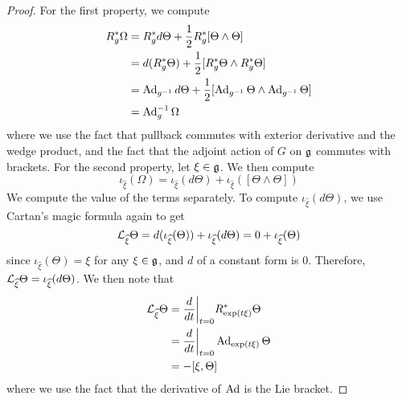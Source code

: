 \begin{proof}
For the first property, we compute
\begin{align*}
R_g^*\Omega &= R_g^*d\Theta + \frac{1}{2} R_g^*[\Theta \wedge \Theta] \\
&= d(R_g^*\Theta)+ \frac{1}{2}[R_g^*\Theta \wedge R_g^*\Theta]\\
&= \operatorname{Ad}_{g^{-1}}d\Theta + \frac{1}{2}[\operatorname{Ad}_{g^{-1}}\Theta \wedge \operatorname{Ad}_{g^{-1}}\Theta] \\
&= \operatorname{Ad}_g^{-1}\Omega
\end{align*}
where we use the fact that pullback commutes with exterior derivative and
the wedge product, and the fact that the adjoint action of $G$ on $\mathfrak{g}$ commutes with
brackets. For the second property, let $\xi \in \mathfrak{g}$. We then compute
\[
\iota_{\widehat{\xi}}(\Omega) = \iota_{\widehat{\xi}}(d\Theta)
+ \iota_{\widehat{\xi}}([\Theta \wedge \Theta])
\]
We compute the value of the terms separately. To compute $\iota_{\widehat{\xi}}(d\Theta)$,
we use Cartan's magic formula again to get
\[
\mathcal{L}_{\widehat{\xi}}\Theta = d(\iota_{\widehat{\xi}}(\Theta))
+ \iota_{\widehat{\xi}}(d\Theta) = 0 + \iota_{\widehat{\xi}}(\Theta)
\]
since $\iota_{\widehat{\xi}}(\Theta) = \xi$ for any $\xi \in \mathfrak{g}$, and $d$ of a
constant form is $0$. Therefore,
$\mathcal{L}_{\widehat{\xi}}\Theta = \iota_{\widehat{\xi}}(d\Theta)$. We then note that
\begin{align*}
\mathcal{L}_{\widehat{\xi}}\Theta &= \frac{d}{dt}\bigg\vert_{t = 0} R_{\exp(t\xi)}^*\Theta \\
&= \frac{d}{dt}\bigg\vert_{t=0} \operatorname{Ad}_{\exp(t\xi)}\Theta \\
&= -[\xi, \Theta]
\end{align*}
where we use the fact that the derivative of $\operatorname{Ad}$ is the Lie bracket.
\end{proof}
%